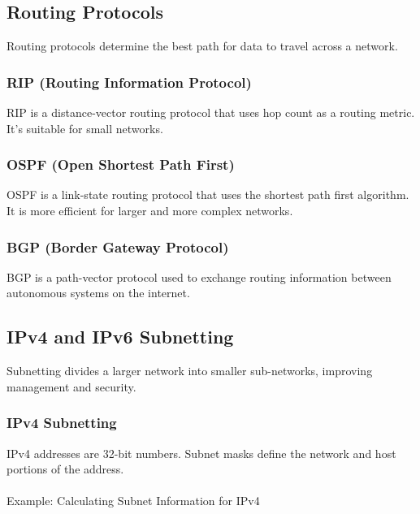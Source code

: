 \documentclass[
  letterpaper,
  DIV=11,
  numbers=noendperiod]{scrreprt}
\makeatletter
\let\oldparagraph\paragraph
\renewcommand{\paragraph}{
    \@ifstar
      \xxxParagraphStar
      \xxxParagraphNoStar
  }
\newcommand{\xxxParagraphStar}[1]{\oldparagraph*{#1}\mbox{}}
\newcommand{\xxxParagraphNoStar}[1]{\oldparagraph{#1}\mbox{}}
\makeatother
\begin{document}
\subsection{Routing Protocols}\label{routing-protocols}

Routing protocols determine the best path for data to travel across a
network.

\subsubsection{RIP (Routing Information
Protocol)}\label{rip-routing-information-protocol}

RIP is a distance-vector routing protocol that uses hop count as a
routing metric. It's suitable for small networks.

\subsubsection{OSPF (Open Shortest Path
First)}\label{ospf-open-shortest-path-first}

OSPF is a link-state routing protocol that uses the shortest path first
algorithm. It is more efficient for larger and more complex networks.

\subsubsection{BGP (Border Gateway
Protocol)}\label{bgp-border-gateway-protocol}

BGP is a path-vector protocol used to exchange routing information
between autonomous systems on the internet.

\subsection{IPv4 and IPv6 Subnetting}\label{ipv4-and-ipv6-subnetting}

Subnetting divides a larger network into smaller sub-networks, improving
management and security.

\subsubsection{IPv4 Subnetting}\label{ipv4-subnetting}

IPv4 addresses are 32-bit numbers. Subnet masks define the network and
host portions of the address.

\paragraph{Example: Calculating Subnet Information for
IPv4}\label{example-calculating-subnet-information-for-ipv4}
\end{document}
